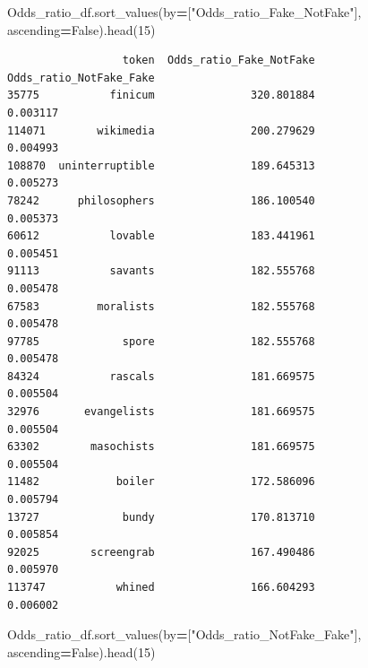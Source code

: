 \documentclass[
  11pt,
  a4paper,
]{article}
\newenvironment{Shaded}{\begin{snugshade}}{\end{snugshade}}
\newcommand{\DecValTok}[1]{\textcolor[rgb]{0.00,0.00,0.81}{#1}}
\newcommand{\NormalTok}[1]{#1}
\newcommand{\OperatorTok}[1]{\textcolor[rgb]{0.81,0.36,0.00}{\textbf{#1}}}
\newcommand{\StringTok}[1]{\textcolor[rgb]{0.31,0.60,0.02}{#1}}
\newcommand{\VariableTok}[1]{\textcolor[rgb]{0.00,0.00,0.00}{#1}}
\begin{document}
\begin{Shaded}
\begin{Highlighting}[]
\NormalTok{Odds\_ratio\_df.sort\_values(by}\OperatorTok{=}\NormalTok{[}\StringTok{"Odds\_ratio\_Fake\_NotFake"}\NormalTok{], ascending}\OperatorTok{=}\VariableTok{False}\NormalTok{).head(}\DecValTok{15}\NormalTok{)}
\end{Highlighting}
\end{Shaded}

\begin{verbatim}
                  token  Odds_ratio_Fake_NotFake  Odds_ratio_NotFake_Fake
35775           finicum               320.801884                 0.003117
114071        wikimedia               200.279629                 0.004993
108870  uninterruptible               189.645313                 0.005273
78242      philosophers               186.100540                 0.005373
60612           lovable               183.441961                 0.005451
91113           savants               182.555768                 0.005478
67583         moralists               182.555768                 0.005478
97785             spore               182.555768                 0.005478
84324           rascals               181.669575                 0.005504
32976       evangelists               181.669575                 0.005504
63302        masochists               181.669575                 0.005504
11482            boiler               172.586096                 0.005794
13727             bundy               170.813710                 0.005854
92025        screengrab               167.490486                 0.005970
113747           whined               166.604293                 0.006002
\end{verbatim}

\begin{Shaded}
\begin{Highlighting}[]
\NormalTok{Odds\_ratio\_df.sort\_values(by}\OperatorTok{=}\NormalTok{[}\StringTok{"Odds\_ratio\_NotFake\_Fake"}\NormalTok{], ascending}\OperatorTok{=}\VariableTok{False}\NormalTok{).head(}\DecValTok{15}\NormalTok{)}
\end{Highlighting}
\end{Shaded}
\end{document}
